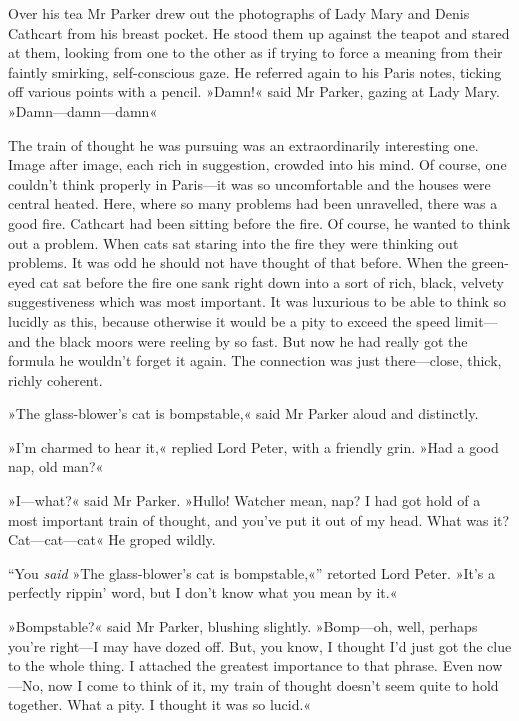 Over his tea Mr Parker drew out the photographs of Lady Mary and Denis Cathcart from his breast pocket. He stood them up against the teapot and stared at them, looking from one to the other as if trying to force a meaning from their faintly smirking, self-conscious gaze. He referred again to his Paris notes, ticking off various points with a pencil.  »Damn!« said Mr Parker, gazing at Lady Mary. »Damn\allowbreak---\allowbreak damn---damn\longdash«

The train of thought he was pursuing was an extraordinarily interesting one. Image after image, each rich in suggestion, crowded into his mind. Of course, one couldn't think properly in Paris\allowbreak---\allowbreak it was so uncomfortable and the houses were central heated. Here, where so many problems had been unravelled, there was a good fire. Cathcart had been sitting before the fire. Of course, he wanted to think out a problem.  When cats sat staring into the fire they were thinking out problems. It was odd he should not have thought of that before. When the green-eyed cat sat before the fire one sank right down into a sort of rich, black, velvety suggestiveness which was most important. It was luxurious to be able to think so lucidly as this, because otherwise it would be a pity to exceed the speed limit\allowbreak---\allowbreak and the black moors were reeling by so fast.  But now he had really got the formula he wouldn't forget it again. The connection was just there\allowbreak---\allowbreak close, thick, richly coherent.

»The glass-blower's cat is bompstable,« said Mr Parker aloud and distinctly.

»I'm charmed to hear it,« replied Lord Peter, with a friendly grin.  »Had a good nap, old man?«

»I\allowbreak---\allowbreak what?« said Mr Parker. »Hullo! Watcher mean, nap? I had got hold of a most important train of thought, and you've put it out of my head.  What was it? Cat\allowbreak---\allowbreak cat---cat\longdash« He groped wildly.

\enquote{You \textit{said} »The glass-blower's cat is bompstable,«} retorted Lord Peter. »It's a perfectly rippin' word, but I don't know what you mean by it.«

»Bompstable?« said Mr Parker, blushing slightly. »Bomp\allowbreak---\allowbreak oh, well, perhaps you're right\allowbreak---\allowbreak I may have dozed off. But, you know, I thought I'd just got the clue to the whole thing. I attached the greatest importance to that phrase. Even now\allowbreak---\allowbreak No, now I come to think of it, my train of thought doesn't seem quite to hold together. What a pity. I thought it was so lucid.«

